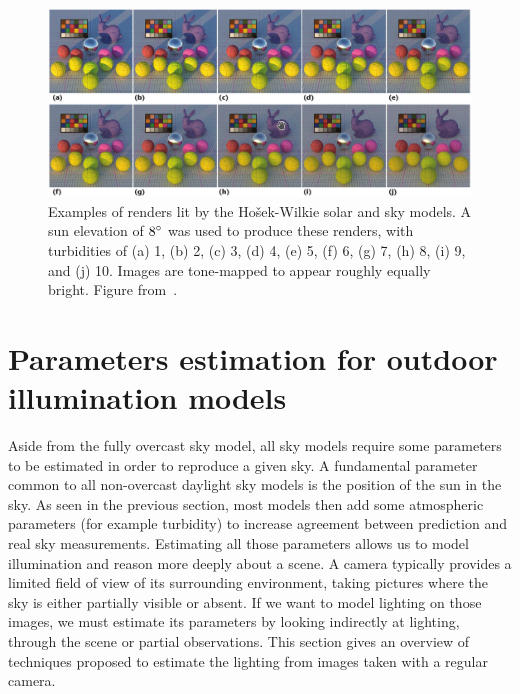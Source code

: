 \begin{figure}
\centering
\includegraphics[width=0.96\linewidth]{3rdparty/hwsun-renders.png}
\caption[Examples renders lit by the Ho\v{s}ek-Wilkie solar and sky models]{Examples of renders lit by the Ho\v{s}ek-Wilkie solar and sky models. A sun elevation of $8^{\circ}$ was used to produce these renders, with turbidities of (a) 1, (b) 2, (c) 3, (d) 4, (e) 5, (f) 6, (g) 7, (h) 8, (i) 9, and (j) 10. Images are tone-mapped to appear roughly equally bright. Figure from~\cite{hosek-siggraph-12}.}
\label{fig:hw_renders_model}
\end{figure}

\section{Parameters estimation for outdoor illumination models}
\label{sec:sky_param_estim}

Aside from the fully overcast sky model, all sky models require some parameters to be estimated in order to reproduce a given sky. A fundamental parameter common to all non-overcast daylight sky models is the position of the sun in the sky. As seen in the previous section, most models then add some atmospheric parameters (for example turbidity) to increase agreement between prediction and real sky measurements. Estimating all those parameters allows us to model illumination and reason more deeply about a scene. A camera typically provides a limited field of view of its surrounding environment, taking pictures where the sky is either partially visible or absent. If we want to model lighting on those images, we must estimate its parameters by looking indirectly at lighting, through the scene or partial observations. This section gives an overview of techniques proposed to estimate the lighting from images taken with a regular camera. 

